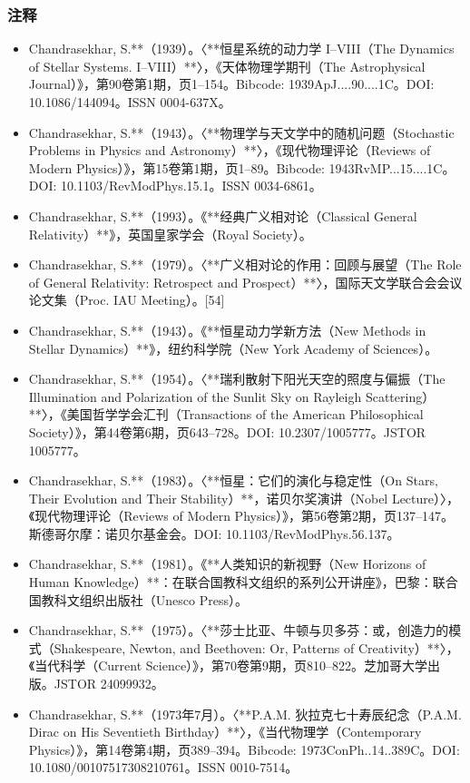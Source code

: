 \subsubsection{注释}
\begin{itemize}
\item Chandrasekhar, S.**（1939）。〈**恒星系统的动力学 I–VIII（The Dynamics of Stellar Systems. I–VIII）**〉，《天体物理学期刊（The Astrophysical Journal）》，第90卷第1期，页1–154。Bibcode: 1939ApJ....90....1C。DOI: 10.1086/144094。ISSN 0004-637X。
\item Chandrasekhar, S.**（1943）。〈**物理学与天文学中的随机问题（Stochastic Problems in Physics and Astronomy）**〉，《现代物理评论（Reviews of Modern Physics）》，第15卷第1期，页1–89。Bibcode: 1943RvMP...15....1C。DOI: 10.1103/RevModPhys.15.1。ISSN 0034-6861。
\item Chandrasekhar, S.**（1993）。《**经典广义相对论（Classical General Relativity）**》，英国皇家学会（Royal Society）。
\item Chandrasekhar, S.**（1979）。〈**广义相对论的作用：回顾与展望（The Role of General Relativity: Retrospect and Prospect）**〉，国际天文学联合会会议论文集（Proc. IAU Meeting）。[54]
\item Chandrasekhar, S.**（1943）。《**恒星动力学新方法（New Methods in Stellar Dynamics）**》，纽约科学院（New York Academy of Sciences）。
\item Chandrasekhar, S.**（1954）。〈**瑞利散射下阳光天空的照度与偏振（The Illumination and Polarization of the Sunlit Sky on Rayleigh Scattering）**〉，《美国哲学学会汇刊（Transactions of the American Philosophical Society）》，第44卷第6期，页643–728。DOI: 10.2307/1005777。JSTOR 1005777。
\item Chandrasekhar, S.**（1983）。〈**恒星：它们的演化与稳定性（On Stars, Their Evolution and Their Stability）**，诺贝尔奖演讲（Nobel Lecture）〉，《现代物理评论（Reviews of Modern Physics）》，第56卷第2期，页137–147。斯德哥尔摩：诺贝尔基金会。DOI: 10.1103/RevModPhys.56.137。
\item Chandrasekhar, S.**（1981）。《**人类知识的新视野（New Horizons of Human Knowledge）**：在联合国教科文组织的系列公开讲座》，巴黎：联合国教科文组织出版社（Unesco Press）。
\item Chandrasekhar, S.**（1975）。〈**莎士比亚、牛顿与贝多芬：或，创造力的模式（Shakespeare, Newton, and Beethoven: Or, Patterns of Creativity）**〉，《当代科学（Current Science）》，第70卷第9期，页810–822。芝加哥大学出版。JSTOR 24099932。
\item Chandrasekhar, S.**（1973年7月）。〈**P.A.M. 狄拉克七十寿辰纪念（P.A.M. Dirac on His Seventieth Birthday）**〉，《当代物理学（Contemporary Physics）》，第14卷第4期，页389–394。Bibcode: 1973ConPh..14..389C。DOI: 10.1080/00107517308210761。ISSN 0010-7514。

\end{itemize}

